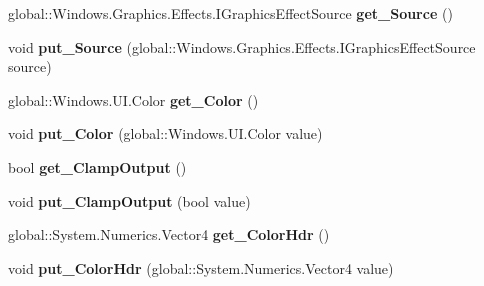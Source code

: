 \begin{DoxyCompactItemize}
global\+::\+Windows.\+Graphics.\+Effects.\+I\+Graphics\+Effect\+Source {\bfseries get\+\_\+\+Source} ()
\item 
\mbox{\label{interface_microsoft_1_1_graphics_1_1_canvas_1_1_effects_1_1_i_tint_effect_a956f6e4a96e8243eaea0b5c74184238f}} 
void {\bfseries put\+\_\+\+Source} (global\+::\+Windows.\+Graphics.\+Effects.\+I\+Graphics\+Effect\+Source source)
\item 
\mbox{\label{interface_microsoft_1_1_graphics_1_1_canvas_1_1_effects_1_1_i_tint_effect_a9740906fbd4edf788c38a4ffe4f56c9f}} 
global\+::\+Windows.\+U\+I.\+Color {\bfseries get\+\_\+\+Color} ()
\item 
\mbox{\label{interface_microsoft_1_1_graphics_1_1_canvas_1_1_effects_1_1_i_tint_effect_a9a8048767dbe8e55365b0088713b81aa}} 
void {\bfseries put\+\_\+\+Color} (global\+::\+Windows.\+U\+I.\+Color value)
\item 
\mbox{\label{interface_microsoft_1_1_graphics_1_1_canvas_1_1_effects_1_1_i_tint_effect_a4cac70c0257b0afafba73f50651187dc}} 
bool {\bfseries get\+\_\+\+Clamp\+Output} ()
\item 
\mbox{\label{interface_microsoft_1_1_graphics_1_1_canvas_1_1_effects_1_1_i_tint_effect_ae2e523533c05f903031fbbb09375c030}} 
void {\bfseries put\+\_\+\+Clamp\+Output} (bool value)
\item 
\mbox{\label{interface_microsoft_1_1_graphics_1_1_canvas_1_1_effects_1_1_i_tint_effect_afb63c71fa3347d9d70b3a6af7f2c05f0}} 
global\+::\+System.\+Numerics.\+Vector4 {\bfseries get\+\_\+\+Color\+Hdr} ()
\item 
\mbox{\label{interface_microsoft_1_1_graphics_1_1_canvas_1_1_effects_1_1_i_tint_effect_ad0bd40be0fe7e352f9d1a9407f7c32a8}} 
void {\bfseries put\+\_\+\+Color\+Hdr} (global\+::\+System.\+Numerics.\+Vector4 value)

\end{DoxyCompactItemize}
